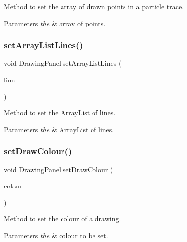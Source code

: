 Method to set the array of drawn points in a particle trace. 


\begin{DoxyParams}{Parameters}
{\em the} & array of points. \\
\hline
\end{DoxyParams}
\mbox{\label{class_drawing_panel_a7fd34e1524b98d70607998bafbc71d8b}} 
\subsubsection{\texorpdfstring{set\+Array\+List\+Lines()}{setArrayListLines()}}
{\footnotesize\ttfamily void Drawing\+Panel.\+set\+Array\+List\+Lines (\begin{DoxyParamCaption}\item[{Array\+List$<$ \hyperlink{class_line}{Line} $>$}]{line }\end{DoxyParamCaption})}



Method to set the Array\+List of lines. 


\begin{DoxyParams}{Parameters}
{\em the} & Array\+List of lines. \\
\hline
\end{DoxyParams}
\mbox{\label{class_drawing_panel_a7b1a3aaefb7f62604525ebb494f6faa6}} 
\subsubsection{\texorpdfstring{set\+Draw\+Colour()}{setDrawColour()}}
{\footnotesize\ttfamily void Drawing\+Panel.\+set\+Draw\+Colour (\begin{DoxyParamCaption}\item[{Color}]{colour }\end{DoxyParamCaption})}



Method to set the colour of a drawing. 


\begin{DoxyParams}{Parameters}
{\em the} & colour to be set. \\
\hline
\end{DoxyParams}
\mbox{\label{class_drawing_panel_a7fdcb0fc4a40945930517bdf664d6179}} 
